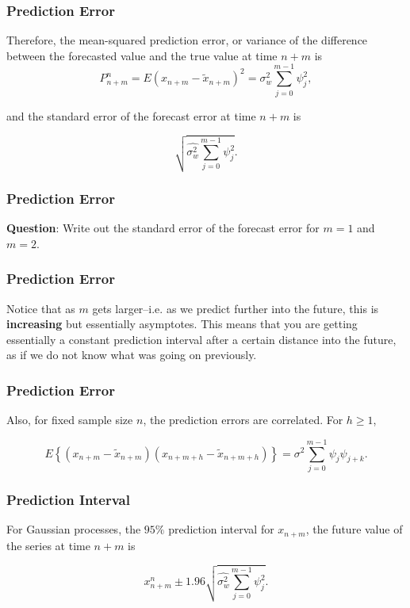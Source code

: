 \documentclass[%
xcolor=pdftex]{beamer}
\begin{document}
\begin{frame}
\frametitle{Prediction Error}

Therefore, the mean-squared prediction error, or variance of the difference between the forecasted value and the true value at time $n+m$ is
\begin{equation} \label{eq:pred_error}
P_{n+m}^n=E(x_{n+m} -\widetilde{x}_{n+m})^2=\sigma_w^2 \sum_{j=0}^{m-1} \psi^2_j,
\end{equation}

and the standard error of the forecast error at time $n+m$ is

\begin{equation} \label{eq:se_error}
\sqrt{\hat{\sigma_w^2} \sum_{j=0}^{m-1} \psi^2_j}.
\end{equation}

\end{frame}

\begin{frame}
\frametitle{Prediction Error}

\textbf{Question}: Write out the standard error of the forecast error for $m=1$ and $m=2$.

\vspace{50mm}

\end{frame}



\begin{frame}
\frametitle{Prediction Error}

Notice that as $m$ gets larger--i.e. as we predict further into
the future, this is \textbf{increasing} but essentially asymptotes. This
means that you are getting essentially a constant prediction
interval after a certain distance into the future, as if we do not know what was going on previously.

\end{frame}

\begin{frame}
\frametitle{Prediction Error}

Also, for fixed sample size $n$, the prediction errors are correlated. For $h \geq 1$,

$$
E\left\{(x_{n+m} -\widetilde{x}_{n+m})(x_{n+m+h} -\widetilde{x}_{n+m+h})\right\}=\sigma^2 \sum_{j=0}^{m-1} \psi_j \psi_{j+k}.
$$

\end{frame}

\begin{frame}
\frametitle{Prediction Interval}

For Gaussian processes, the $95\%$ prediction interval for $x_{n+m}$, the future value of the series at time $n+m$ is

\begin{equation}
x_{n+m}^{n} \pm 1.96 \sqrt{\hat{\sigma_w^2} \sum_{j=0}^{m-1} \psi_j^2}.
\end{equation}

\end{frame}
\end{document}
